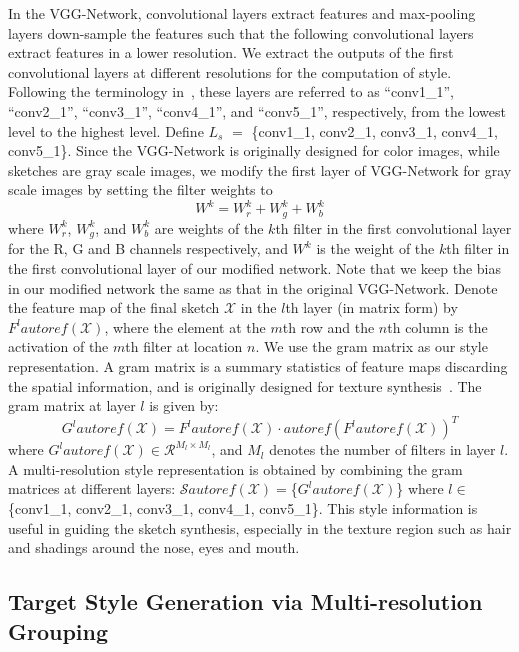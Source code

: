 \documentclass[10pt,twocolumn,letterpaper]{article}
\begin{document}
In the VGG-Network, convolutional layers extract features and max-pooling layers down-sample the features such that the following convolutional layers extract features in a lower resolution. We extract the outputs of the first convolutional layers at different resolutions for the computation of style. Following the terminology in~\cite{gatys2015texture}, these layers are referred to as ``conv1\_1'', ``conv2\_1'', ``conv3\_1'', ``conv4\_1'', and ``conv5\_1'', respectively, from the lowest level to the highest level. Define $L_s$ $=$ \{conv1\_1, conv2\_1, conv3\_1, conv4\_1, conv5\_1\}. Since the VGG-Network is originally designed for color images, while sketches are gray scale images, we modify the first layer of VGG-Network for gray scale images by setting the filter weights to
\begin{equation}
W^{k} = W^{k}_r+W^{k}_g+W^{k}_b
\label{eq:VGG_weights}
\end{equation}
where $W^{k}_r$, $W^{k}_g$, and $W^{k}_b$ are weights of the $k$th filter in the first convolutional layer for the R, G and B channels respectively, and $W^{k}$ is the weight of the $k$th filter in the first convolutional layer of our modified network. Note that we keep the bias in our modified network the same as that in the original VGG-Network. Denote the feature map of the final sketch $\mathcal{X}$ in the $l$th layer (in matrix form) by $F^{l}autoref(\mathcal{X})$, where the element at the $m$th row and the $n$th column is the activation of the $m$th filter at location $n$. We use the gram matrix as our style representation. A gram matrix is a summary statistics of feature maps discarding the spatial information, and  is originally designed for texture synthesis~\cite{gatys2015texture}. The gram matrix at layer $l$ is given by:
\begin{equation}
G^lautoref(\mathcal{X}) = {F^lautoref(\mathcal{X})} \cdot {autoref( {{F^lautoref(\mathcal{X})}} )^T}
\label{eq:Gram_element}
\end{equation}
where ${G^lautoref(\mathcal{X})} \in {\mathcal{R}^{{M_l} \times {M_l}}}$, and $M_l$ denotes the number of filters in layer $l$. A multi-resolution style representation is obtained by combining the gram matrices at different layers: $\mathcal{S}autoref(\mathcal{X})=$\{$G^l autoref(\mathcal{X})$\} where $l\in$\{conv1\_1, conv2\_1, conv3\_1, conv4\_1, conv5\_1\}. This style information is useful in guiding the sketch synthesis, especially in the texture region such as hair and shadings around the nose, eyes and mouth. 
{
\subsection{Target Style Generation via Multi-resolution Grouping}
}
\end{document}
